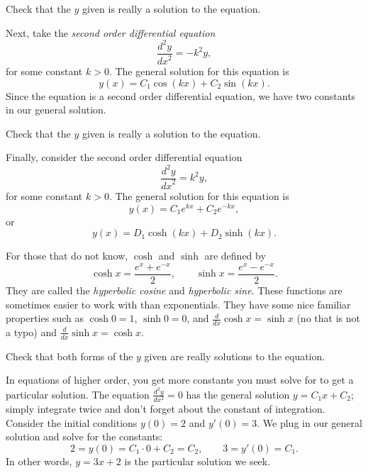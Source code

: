 \documentclass{ximera}
\begin{document}
\begin{exercise}
    Check that the $y$ given is really a solution to the equation.
\end{exercise}

Next, take the \emph{second order differential equation}
\begin{equation*}
    \frac{d^2y}{{dx}^2} = -k^2 y ,
\end{equation*}
for some constant $k > 0$. The general solution for this equation is
\begin{equation*}
    y(x) = C_1 \cos(kx) + C_2 \sin(kx) .
\end{equation*}
Since the equation is a second order differential equation, we have two constants in our general solution.

\begin{exercise}
    Check that the $y$ given is really a solution to the equation.
\end{exercise}

Finally, consider the second order differential equation
\begin{equation*}
    \frac{d^2y}{{dx}^2} = k^2 y ,
\end{equation*}
for some constant $k > 0$. The general solution for this equation is
\begin{equation*}
    y(x) = C_1 e^{kx} + C_2 e^{-kx} ,
\end{equation*}
or
\begin{equation*}
    y(x) = D_1 \cosh(kx) + D_2 \sinh(kx) .
\end{equation*}

For those that do not know, $\cosh$ and $\sinh$ are defined by
\begin{equation*}
    \cosh x = \frac{e^{x} + e^{-x}}{2} , \qquad \sinh x = \frac{e^{x} - e^{-x}}{2} .
\end{equation*}
They are called the \emph{hyperbolic cosine} and \emph{hyperbolic sine}. These functions are sometimes easier to work with than exponentials.  They have some nice familiar properties such as $\cosh 0 = 1$, $\sinh 0 = 0$, and $\frac{d}{dx} \cosh x = \sinh x$ (no that is not a typo) and $\frac{d}{dx} \sinh x = \cosh x$.

\begin{exercise}
    Check that both forms of the $y$ given are really solutions to the equation.
\end{exercise}

\begin{example}
    In equations of higher order, you get more constants you must solve for to get a particular solution.  The equation $\frac{d^2y}{dx^2} = 0$ has the general solution $y = C_1 x + C_2$; simply integrate twice and don't forget about the constant of integration.  Consider the initial conditions $y(0) = 2$ and $y'(0) = 3$.  We plug in our general solution and solve for the constants:
    \begin{equation*}
        2 = y(0) = C_1 \cdot 0 + C_2 = C_2, \qquad 3 = y'(0) = C_1 .
    \end{equation*}
    In other words, $y = 3x + 2$ is the particular solution we seek.
\end{example}
\end{document}
